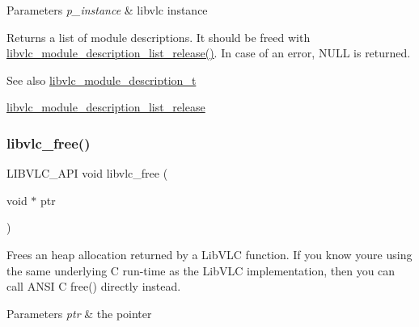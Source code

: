 \begin{DoxyParams}{Parameters}
{\em p\+\_\+instance} & libvlc instance\\
\hline
\end{DoxyParams}
\begin{DoxyReturn}{Returns}
a list of module descriptions. It should be freed with \hyperlink{group__libvlc__core_ga6f077c04819910cf821e107be8b258a9}{libvlc\+\_\+module\+\_\+description\+\_\+list\+\_\+release()}. In case of an error, N\+U\+LL is returned.
\end{DoxyReturn}
\begin{DoxySeeAlso}{See also}
\hyperlink{structlibvlc__module__description__t}{libvlc\+\_\+module\+\_\+description\+\_\+t} 

\hyperlink{group__libvlc__core_ga6f077c04819910cf821e107be8b258a9}{libvlc\+\_\+module\+\_\+description\+\_\+list\+\_\+release} 
\end{DoxySeeAlso}
\mbox{\label{group__libvlc__core_gab42b9c99de37cddea9b4e817cf14524f}} 
\subsubsection{\texorpdfstring{libvlc\+\_\+free()}{libvlc\_free()}}
{\footnotesize\ttfamily L\+I\+B\+V\+L\+C\+\_\+\+A\+PI void libvlc\+\_\+free (\begin{DoxyParamCaption}\item[{void $\ast$}]{ptr }\end{DoxyParamCaption})}

Frees an heap allocation returned by a Lib\+V\+LC function. If you know you\textquotesingle{}re using the same underlying C run-\/time as the Lib\+V\+LC implementation, then you can call A\+N\+SI C free() directly instead.


\begin{DoxyParams}{Parameters}
{\em ptr} & the pointer \\
\hline
\end{DoxyParams}
\mbox{\label{group__libvlc__core_gad308de3b963863e211c952636b2bde40}} 
